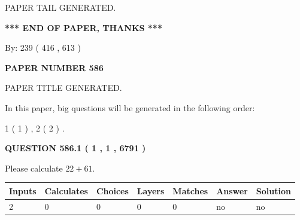 \documentclass[12pt]{article}
\begin{document}
   
   
\vspace{2.0in} PAPER TAIL GENERATED.
   
   
   
   
\vspace{1.0in} 
{\textbf{\large{ *** END OF PAPER, THANKS *** }}} 
   
   
\hspace{1.0in} By: 
 239 ( 416 ,  613 )
   
   
   
   
\newpage 
\setcounter{page}{ 
   586001 } 
   
   
   
   
 {\textbf{ \Large{ PAPER NUMBER  586  }}}
   
   
\vspace{0.2in}
   
   
   
   
   
   
   
   
 \vspace{0.2in}
 
 
 
 
   
   
 PAPER TITLE GENERATED.
   
   
   
\vspace{0.2in}
   
In this paper, big questions will be generated in the following order: 
   
   
   1 ( 1 )
 ,
   2 ( 2 )
 .
  
\vspace{0.2in}
  
{\textbf{\Large{QUESTION
586.1 
 ( 1 , 1 , 6791 )
}}}
  
  
 
Please calculate $ %
22 +  %
61 $.
 
 
   
   
   
   
\noindent\begin{tabular}{|l|l|l|l|l|l|l|}
 \hline
Inputs & Calculates & Choices & Layers & Matches & Answer & Solution \\ \hline
 2  & 
 0  & 
 0
  & 
 0  & 
 0  & 
  no & 
  no 
  \\ \hline
 \end{tabular}
   
\end{document}
